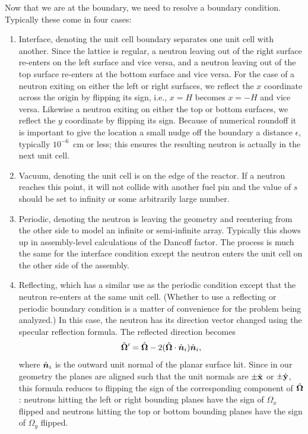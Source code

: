 Now that we are at the boundary, we need to resolve a boundary condition. Typically these come in four cases:
\begin{enumerate}
  \item Interface, denoting the unit cell boundary separates one unit cell with another. Since the lattice is regular, a neutron leaving out of the right surface re-enters on the left surface and vice versa, and a neutron leaving out of the top surface re-enters at the bottom surface and vice versa. For the case of a neutron exiting on either the left or right surfaces, we reflect the $x$ coordinate across the origin by flipping its sign, i.e., $x = H$ becomes $x = -H$ and vice versa. Likewise a neutron exiting on either the top or bottom surfaces, we reflect the $y$ coordinate by flipping its sign. Because of numerical roundoff it is important to give the location a small nudge off the boundary a distance $\epsilon$, typically $10^{-6}$~cm or less; this ensures the resulting neutron is actually in the next unit cell.
  
  \item Vacuum, denoting the unit cell is on the edge of the reactor. If a neutron reaches this point, it will not collide with another fuel pin and the value of $s$ should be set to infinity or some arbitrarily large number.
  
  \item Periodic, denoting the neutron is leaving the geometry and reentering from the other side to model an infinite or semi-infinite array. Typically this shows up in assembly-level calculations of the Dancoff factor. The process is much the same for the interface condition except the neutron enters the unit cell on the other side of the assembly.
  
  \item Reflecting, which has a similar use as the periodic condition except that the neutron re-enters at the same unit cell. (Whether to use a reflecting or periodic boundary condition is a matter of convenience for the problem being analyzed.) In this case, the neutron has its direction vector changed using the specular reflection formula. The reflected direction becomes
  \begin{align}
     \hat{\mathbf{\Omega}}' = \hat{\mathbf{\Omega}} - 2 ( \hat{\mathbf{\Omega}} \cdot \hat{\bm{n}}_i ) \hat{\bm{n}}_i,
  \end{align}
  where $\hat{\bm{n}}_i$ is the outward unit normal of the planar surface hit. Since in our geometry the planes are aligned such that the unit normals are $\pm \hat{\mathbf{x}}$ or $\pm \hat{\mathbf{y}}$, this formula reduces to flipping the sign of the corresponding component of $\hat{\mathbf{\Omega}}$: neutrons hitting the left or right bounding planes have the sign of $\Omega_x$ flipped and neutrons hitting the top or bottom bounding planes have the sign of $\Omega_y$ flipped.
\end{enumerate}

